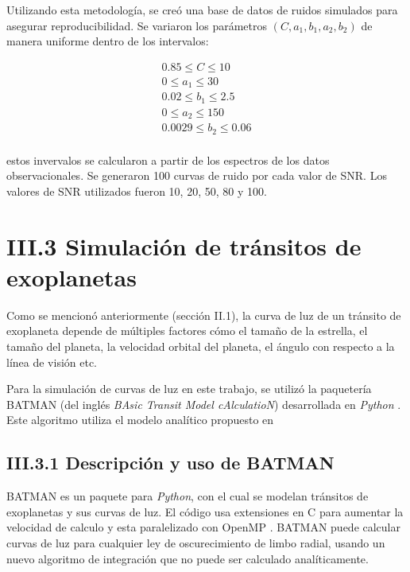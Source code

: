 Utilizando esta metodología, se creó una base de datos de ruidos simulados para asegurar reproducibilidad. Se variaron los parámetros $(C,a_{1},b_{1},a_{2},b_{2})$ de manera uniforme dentro de los intervalos:

\begin{equation}
  \begin{split}
  0.85 \leq C \leq 10 \\
  0 \leq a_{1} \leq 30 \\
  0.02 \leq b_{1} \leq 2.5 \\
  0 \leq a_{2} \leq 150 \\
  0.0029 \leq b_{2} \leq 0.06 \\
  \end{split}
\end{equation}

estos invervalos se calcularon a partir de los espectros de los datos observacionales. Se generaron 100 curvas de ruido por cada valor de SNR. Los valores de SNR utilizados fueron 10, 20, 50, 80 y 100.


\section*{III.3 Simulación de tránsitos de exoplanetas}


Como se mencionó anteriormente (sección II.1), la curva de luz de un tránsito de exoplaneta depende de múltiples factores cómo el tamaño de la estrella, el tamaño del planeta, la velocidad orbital del planeta, el ángulo con respecto a la línea de visión etc.

Para la simulación de curvas de luz en este trabajo, se utilizó la paquetería BATMAN (del inglés \textit{BAsic Transit Model cAlculatioN}) desarrollada en \textit{Python} \cite{kreidberg2015batman}. Este algoritmo utiliza el modelo analítico propuesto en \cite{mandel2002analytic}


\subsection*{III.3.1 Descripción y uso de BATMAN}

BATMAN es un paquete para \textit{Python}, con el cual se modelan tránsitos de exoplanetas y sus curvas de luz. El código usa extensiones en C para aumentar la velocidad de calculo y esta paralelizado con OpenMP \cite{kreidberg2015batman}. BATMAN puede calcular curvas de luz para cualquier ley de oscurecimiento de limbo radial, usando un nuevo algoritmo de integración que no puede ser calculado analíticamente.

